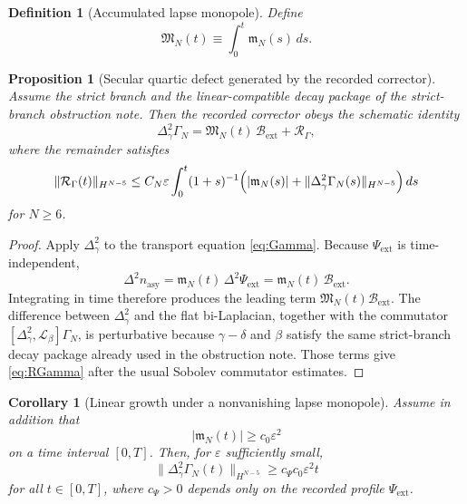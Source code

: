 \documentclass[11pt]{article}
\newcommand{\Ell}{\mathcal{L}}
\newtheorem{definition}{Definition}
\newtheorem{proposition}{Proposition}
\newtheorem{corollary}{Corollary}
\begin{document}
\begin{definition}[Accumulated lapse monopole]
Define
\begin{equation}
\mathfrak M_N(t)
\equiv
\int_0^t \mathfrak m_N(s)\,ds.
\label{eq:MN}
\end{equation}
\end{definition}

\begin{proposition}[Secular quartic defect generated by the recorded corrector]
Assume the strict branch and the linear-compatible decay package of the strict-branch obstruction note. Then the recorded corrector obeys the schematic identity
\begin{equation}
\Delta_\gamma^2\Gamma_N
=
\mathfrak M_N(t)\,\mathcal B_{\mathrm{ext}}
+ \mathcal R_\Gamma,
\label{eq:DGamma}
\end{equation}
where the remainder satisfies
\begin{equation}
\|\mathcal R_\Gamma(t)\|_{H^{N-5}}
\le
C_N\varepsilon
\int_0^t (1+s)^{-1}
\Bigl(
|\mathfrak m_N(s)|
+ \|\Delta_\gamma^2\Gamma_N(s)\|_{H^{N-5}}
\Bigr)\,ds
\label{eq:RGamma}
\end{equation}
for \(N\ge 6\).
\end{proposition}

\begin{proof}
Apply \(\Delta_\gamma^2\) to the transport equation \eqref{eq:Gamma}. Because \(\Psi_{\mathrm{ext}}\) is time-independent,
\[
\Delta^2 n_{\mathrm{asy}}
=
\mathfrak m_N(t)\,\Delta^2\Psi_{\mathrm{ext}}
=
\mathfrak m_N(t)\,\mathcal B_{\mathrm{ext}}.
\]
Integrating in time therefore produces the leading term \(\mathfrak M_N(t)\mathcal B_{\mathrm{ext}}\). The difference between \(\Delta_\gamma^2\) and the flat bi-Laplacian, together with the commutator \([\Delta_\gamma^2,\Ell_\beta]\Gamma_N\), is perturbative because \(\gamma-\delta\) and \(\beta\) satisfy the same strict-branch decay package already used in the obstruction note. Those terms give \eqref{eq:RGamma} after the usual Sobolev commutator estimates.
\end{proof}

\begin{corollary}[Linear growth under a nonvanishing lapse monopole]
Assume in addition that
\begin{equation}
|\mathfrak m_N(t)|\ge c_0\varepsilon^2
\label{eq:mpositive}
\end{equation}
on a time interval \([0,T]\). Then, for \(\varepsilon\) sufficiently small,
\begin{equation}
\|\Delta_\gamma^2\Gamma_N(t)\|_{H^{N-5}}
\ge
c_\Psi c_0 \varepsilon^2 t
\label{eq:linearq}
\end{equation}
for all \(t\in[0,T]\), where \(c_\Psi>0\) depends only on the recorded profile \(\Psi_{\mathrm{ext}}\).
\end{corollary}
\end{document}
